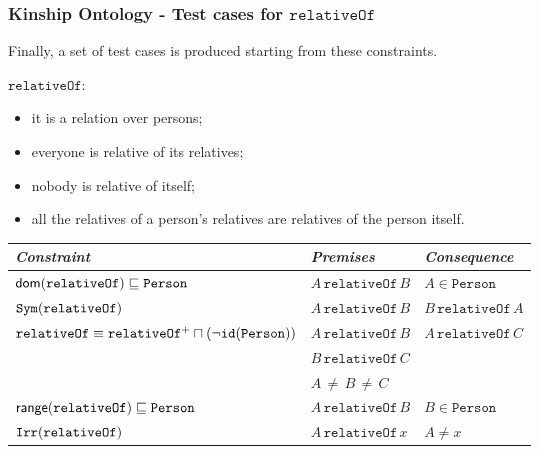 \documentclass[8pt]{beamer}
\newcommand{\Persons}{\mathtt{Person}}
\newcommand{\relative}{\mathtt{relativeOf}}
\newcommand{\Alice}{A}
\newcommand{\Bob}{B}
\newcommand{\Charlie}{C}
\begin{document}
\begin{frame}
\frametitle{Kinship Ontology - Test cases for $\relative$}
  Finally, a set of test cases is produced starting from these constraints.
  \vspace{\baselineskip}
  
  {\Large $\relative$}: \begin{itemize}
   \item it is a relation over persons;
   \item everyone is relative of its relatives;
   \item nobody is relative of itself;
   \item all the relatives of a person's relatives are relatives of the
      person itself.
  \end{itemize}
  \vspace{\baselineskip}

  \begin{small}
  \begin{tabular}{|l|l|l|}
  \hline
  \emph{Constraint} & \emph{Premises} & \emph{Consequence} \\
   \hline
   $\dom(\relative) \Issub \Persons$ & $\Alice\,\relative\,\Bob$ & $\Alice \in \Persons$\\
  \hline
  $\issymmetric{\relative}$ & $\Alice\,\relative\,\Bob$ & $\Bob\,\relative\,\Alice$\\
  \hline
  $\relative \equiv \relative^{+} \sqcap (\neg \roleidentity{\Persons})$&$\Alice\,\relative\,\Bob$&$\Alice\,\relative\,\Charlie$\\
    &$\Bob\,\relative\,\Charlie$&\\
    &$\Alice\,\neq\,\Bob\,\neq\,\Charlie$&\\
  \hline
  $\range(\relative) \Issub \Persons$& $\Alice\,\relative\,\Bob$ & $\Bob \in \Persons$\\
  \hline
  $\isirreflexive{\relative}$& $\Alice\,\relative\,x$& $\Alice\neq x$ \\
 \hline
 \end{tabular}
 \end{small}
\end{frame}
\end{document}
